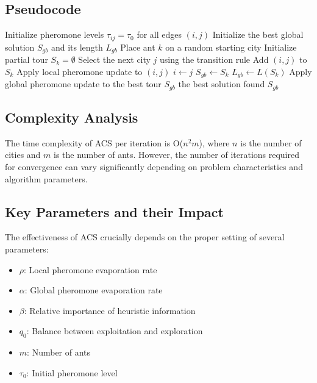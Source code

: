 \subsection{Pseudocode}

\begin{algorithm}[H]
	\caption{\Gls{ACS} for the \Gls{TSP}}
	\begin{algorithmic}[1]
		\State Initialize pheromone levels $\tau_{ij} = \tau_0$ for all edges $(i,j)$
		\State Initialize the best global solution $S_{gb}$ and its length $L_{gb}$
		\State Place ant $k$ on a random starting city
		\State Initialize partial tour $S_k = \emptyset$
		\Repeat
		\State Select the next city $j$ using the transition rule
		\State Add $(i,j)$ to $S_k$
		\State Apply local pheromone update to $(i,j)$
		\State $i \gets j$
		\State $S_{gb} \gets S_k$
		\State $L_{gb} \gets L(S_k)$
		\EndIf
		\EndFor
		\State Apply global pheromone update to the best tour $S_{gb}$
		\EndFor
		\State \Return the best solution found $S_{gb}$
	\end{algorithmic}
	\label{alg:acs}
\end{algorithm}



\subsection{Complexity Analysis}
The time complexity of \Gls{ACS} per iteration is O($n^2m$), where $n$ is the number of cities and $m$ is the number of ants. However, the number of iterations required for convergence can vary significantly depending on problem characteristics and algorithm parameters.

\subsection{Key Parameters and their Impact}
The effectiveness of \Gls{ACS} crucially depends on the proper setting of several parameters:

\begin{itemize}
	\item $\rho$: Local pheromone evaporation rate
	\item $\alpha$: Global pheromone evaporation rate
	\item $\beta$: Relative importance of heuristic information
	\item $q_0$: Balance between exploitation and exploration
	\item $m$: Number of ants
	\item $\tau_0$: Initial pheromone level
\end{itemize}

